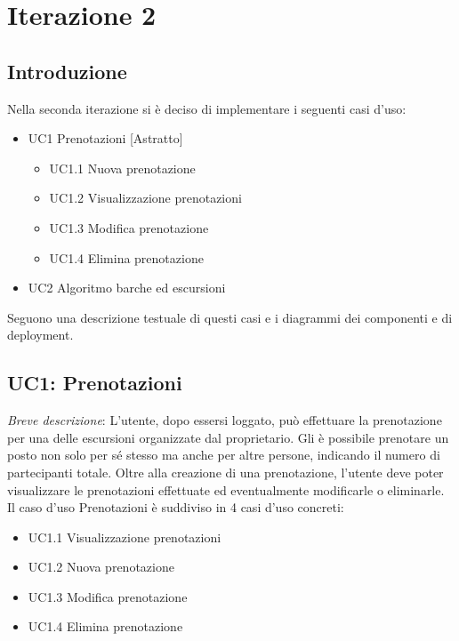 \chapter{Iterazione 2}

\section{Introduzione}
Nella seconda iterazione si è deciso di implementare i seguenti casi d'uso:

\begin{itemize}
    \item UC1 Prenotazioni [Astratto]
    \begin{itemize}
        \item UC1.1 Nuova prenotazione
        \item UC1.2 Visualizzazione prenotazioni
        \item UC1.3 Modifica prenotazione
        \item UC1.4 Elimina prenotazione
    \end{itemize}
    \item UC2 Algoritmo barche ed escursioni
\end{itemize}

Seguono una descrizione testuale di questi casi e i diagrammi dei componenti e di deployment.

\section{UC1: Prenotazioni}
\emph{Breve descrizione}: L'utente, dopo essersi loggato, può effettuare la prenotazione per una delle escursioni organizzate dal proprietario. Gli è possibile prenotare un posto non solo per sé stesso ma anche per altre persone, indicando il numero di partecipanti totale. Oltre alla creazione di una prenotazione, l'utente deve poter visualizzare le prenotazioni effettuate ed eventualmente modificarle o eliminarle.
Il caso d'uso Prenotazioni è suddiviso in 4 casi d'uso concreti:

\begin{itemize}
    \item UC1.1 Visualizzazione prenotazioni 
    \item UC1.2 Nuova prenotazione
    \item UC1.3 Modifica prenotazione
    \item UC1.4 Elimina prenotazione
\end{itemize}

